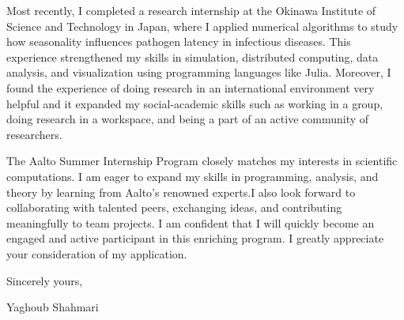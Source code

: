 \documentclass[
	12pt, %
]{letter}
\begin{document}
Most recently, I completed a research internship at the Okinawa Institute of Science and Technology in Japan, where I applied numerical algorithms to study how seasonality influences pathogen latency in infectious diseases. This experience strengthened my skills in simulation, distributed computing, data analysis, and visualization using programming languages like Julia. Moreover, I found the experience of doing research in an international environment very helpful and it expanded my social-academic skills such as working in a group, doing research in a workspace, and being a part of an active community of researchers.

The Aalto Summer Internship Program closely matches my interests in scientific computations. I am eager to expand my skills in programming, analysis, and theory by learning from Aalto's renowned experts.I also look forward to collaborating with talented peers, exchanging ideas, and contributing meaningfully to team projects. I am confident that I will quickly become an engaged and active participant in this enriching program. I greatly appreciate your consideration of my application.

\smallskip %

Sincerely yours,

\bigskip\bigskip\bigskip %

Yaghoub Shahmari

\end{document}
